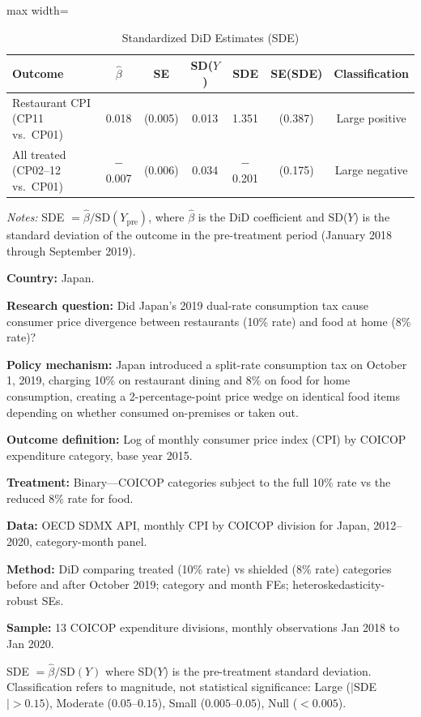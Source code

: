 \begin{table}[htbp]
\centering
\caption{Standardized DiD Estimates (SDE)}
\label{tab:sde}
\begin{adjustbox}{max width=\textwidth}
\begin{tabular}{lcccccc}
\hline\hline
Outcome & $\hat{\beta}$ & SE & SD($Y$) & SDE & SE(SDE) & Classification \\
\hline
Restaurant CPI (CP11 vs.\ CP01) & 0.018 & (0.005) & 0.013 & 1.351 & (0.387) & Large positive \\
All treated (CP02--12 vs.\ CP01) & $-$0.007 & (0.006) & 0.034 & $-$0.201 & (0.175) & Large negative \\
\hline\hline
\end{tabular}
\end{adjustbox}
\begin{tablenotes}[flushleft]
\small
\item \textit{Notes:} SDE $= \hat{\beta} / \text{SD}(Y_{\text{pre}})$, where $\hat{\beta}$ is the DiD coefficient and SD($Y$) is the standard deviation of the outcome in the pre-treatment period (January 2018 through September 2019).
\item
\item \textbf{Country:} Japan.
\item \textbf{Research question:} Did Japan's 2019 dual-rate consumption tax cause consumer price divergence between restaurants (10\% rate) and food at home (8\% rate)?
\item \textbf{Policy mechanism:} Japan introduced a split-rate consumption tax on October 1, 2019, charging 10\% on restaurant dining and 8\% on food for home consumption, creating a 2-percentage-point price wedge on identical food items depending on whether consumed on-premises or taken out.
\item \textbf{Outcome definition:} Log of monthly consumer price index (CPI) by COICOP expenditure category, base year 2015.
\item \textbf{Treatment:} Binary---COICOP categories subject to the full 10\% rate vs the reduced 8\% rate for food.
\item \textbf{Data:} OECD SDMX API, monthly CPI by COICOP division for Japan, 2012--2020, category-month panel.
\item \textbf{Method:} DiD comparing treated (10\% rate) vs shielded (8\% rate) categories before and after October 2019; category and month FEs; heteroskedasticity-robust SEs.
\item \textbf{Sample:} 13 COICOP expenditure divisions, monthly observations Jan 2018 to Jan 2020.
\item
\item SDE $= \hat{\beta} / \text{SD}(Y)$ where SD($Y$) is the pre-treatment standard deviation. Classification refers to magnitude, not statistical significance: Large ($|$SDE$| > 0.15$), Moderate ($0.05$--$0.15$), Small ($0.005$--$0.05$), Null ($< 0.005$).
\end{tablenotes}
\end{table}

